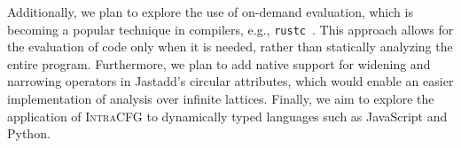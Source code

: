 Additionally, we plan to explore the use of on-demand evaluation, which is becoming a popular 
technique in compilers, e.g., \texttt{rustc}~\cite{Rust_Query_Guide}. This approach allows for the 
evaluation of code only when it is needed, rather than statically analyzing the 
entire program. Furthermore, we plan to add native support for widening and narrowing 
operators in Jastadd's circular attributes, which would enable an easier implementation
of analysis over infinite lattices. Finally, we aim to explore the application of \textsc{IntraCFG} to 
dynamically typed languages such as JavaScript and Python.